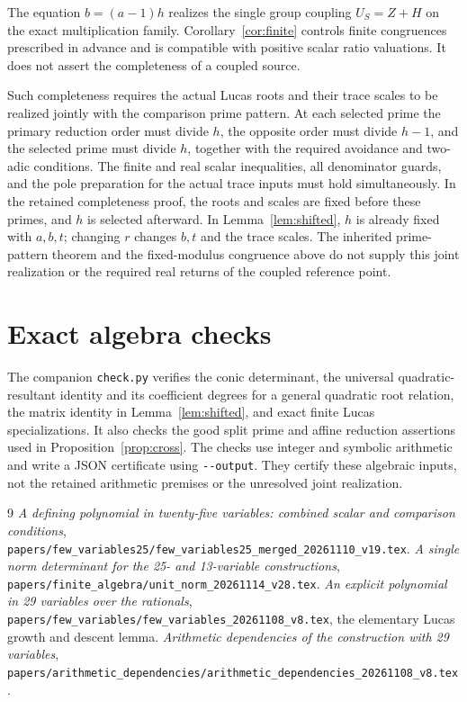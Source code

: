 \documentclass[11pt,a4paper]{article}
\begin{document}
The equation $b=(a-1)h$ realizes the single group coupling
$U_S=Z+H$ on the exact multiplication family.
Corollary~\ref{cor:finite} controls finite congruences prescribed
in advance and is compatible with positive scalar ratio valuations.
It does not assert the completeness of a coupled source.

Such completeness requires the actual Lucas roots and their trace
scales to be realized jointly with the comparison prime pattern.
At each selected prime the primary reduction order must divide
$h$, the opposite order must divide $h-1$, and the selected prime
must divide $h$, together with the required avoidance and
two-adic conditions. The finite and real scalar inequalities,
all denominator guards, and the pole preparation for the actual
trace inputs must hold simultaneously.
In the retained completeness proof, the roots and scales are fixed
before these primes, and $h$ is selected afterward. In
Lemma~\ref{lem:shifted}, $h$ is already fixed with $a,b,t$;
changing $r$ changes $b,t$ and the trace scales. The inherited
prime-pattern theorem \cite{Dependencies} and the fixed-modulus
congruence above do not supply this joint realization or the
required real returns of the coupled reference point.

\section{Exact algebra checks}

The companion \nolinkurl{check.py} verifies the conic determinant,
the universal quadratic-resultant identity and its coefficient
degrees for a general quadratic root relation, the matrix identity
in Lemma~\ref{lem:shifted}, and exact finite Lucas specializations.
It also checks the good split prime and affine reduction assertions
used in Proposition~\ref{prop:cross}. The checks use integer and
symbolic arithmetic and write a JSON certificate using
\nolinkurl{--output}. They certify these algebraic inputs, not the
retained arithmetic premises or the unresolved joint realization.

\begin{thebibliography}{9}
\emph{A defining polynomial in twenty-five variables: combined scalar
and comparison conditions},
\nolinkurl{papers/few_variables25/few_variables25_merged_20261110_v19.tex}.
\emph{A single norm determinant for the 25- and 13-variable constructions},
\nolinkurl{papers/finite_algebra/unit_norm_20261114_v28.tex}.
\emph{An explicit polynomial in 29 variables over the rationals},
\nolinkurl{papers/few_variables/few_variables_20261108_v8.tex},
the elementary Lucas growth and descent lemma.
\emph{Arithmetic dependencies of the construction with 29 variables},
\nolinkurl{papers/arithmetic_dependencies/arithmetic_dependencies_20261108_v8.tex}.
\end{thebibliography}
\end{document}
